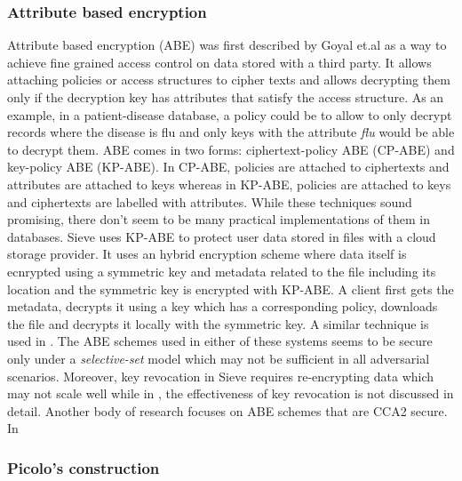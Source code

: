 \subsubsection{Attribute based encryption}
Attribute based encryption (ABE) \cite{abe} was first described by Goyal et.al as a way to achieve fine grained access control on data stored with a third party. It allows attaching policies or access structures to cipher texts and allows decrypting them only if the decryption key has attributes that satisfy the access structure. As an example, in a patient-disease database, a policy could be to allow to only decrypt records where the disease is flu and only keys with the attribute \textit{flu} would be able to decrypt them. ABE comes in two forms: ciphertext-policy ABE (CP-ABE) and key-policy ABE (KP-ABE). In CP-ABE, policies are attached to ciphertexts and attributes are attached to keys whereas in KP-ABE, policies are attached to keys and ciphertexts are labelled with attributes. While these techniques sound promising, there don't seem to be many practical implementations of them in databases. Sieve \cite{sieve} uses KP-ABE to protect user data stored in files with a cloud storage provider. It uses an hybrid encryption scheme where data itself is ecnrypted using a symmetric key and metadata related to the file including its location and the symmetric key is encrypted with KP-ABE. A client first gets the metadata, decrypts it using a key which has a corresponding policy, downloads the file and decrypts it locally with the symmetric key. A similar technique is used in \cite{PPEHR}. The ABE schemes used in either of these systems seems to be secure only under a \textit{selective-set} model which  may not be sufficient in all adversarial scenarios. Moreover, key revocation in Sieve requires re-encrypting data which may not scale well while in \cite{PPEHR}, the effectiveness of key revocation is not discussed in detail.
\newline\newline
Another body of research focuses on ABE schemes that are CCA2 secure. In \cite{cca2_abe1}

\subsubsection{Picolo's construction}